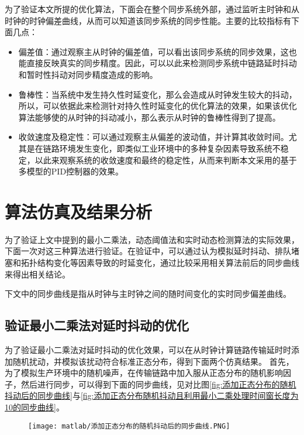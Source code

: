 为了验证本文所提的优化算法，下面会在整个同步系统外部，通过监听主时钟和从时钟的时钟偏差曲线，从而可以知道该同步系统的同步性能。主要的比较指标有下面几点：
\begin{itemize}[noitemsep,topsep=0pt,parsep=0pt,partopsep=0pt]
  \item 偏差值：通过观察主从时钟的偏差值，可以看出该同步系统的同步效果，这也能直接反映真实的同步精度。因此，可以以此来检测同步系统中链路延时抖动和暂时性抖动对同步精度造成的影响。
  \item 鲁棒性：当系统中发生持久性时延变化，那么会造成从时钟发生较大的抖动，所以，可以依据此来检测针对持久性时延变化的优化算法的效果，如果该优化算法能够使的从时钟的抖动减小，那么表示从时钟的鲁棒性得到了提高。
  \item 收敛速度及稳定性：可以通过观察主从偏差的波动值，并计算其收敛时间。尤其是在链路环境发生变化，即类似工业环境中的多种复杂因素导致系统不稳定，以此来观察系统的收敛速度和最终的稳定性，从而来判断本文采用的基于多模型的PID控制器的效果。
\end{itemize}

\section{算法仿真及结果分析}
为了验证上文中提到的最小二乘法，动态阈值法和实时动态检测算法的实际效果，下面一次对这三种算法进行验证。在验证中，可以通过认为模拟延时抖动、排队堵塞和拓扑结构变化等因素导致的时延变化，通过比较采用相关算法前后的同步曲线来得出相关结论。

下文中的同步曲线是指从时钟与主时钟之间的随时间变化的实时同步偏差曲线。

\subsection{验证最小二乘法对延时抖动的优化}
为了验证最小二乘法对延时抖动的优化效果，可以在从时钟计算链路传输延时时添加随机扰动，并模拟该扰动符合标准正态分布，得到下面两个仿真结果。
首先，为了模拟生产环境中的随机噪声，在传输链路中加入服从正态分布的随机影响因子，然后进行同步，可以得到下面的同步曲线，见对比图\ref{fig:添加正态分布的随机抖动后的同步曲线}与\ref{fig:添加正态分布随机抖动且利用最小二乘处理时间窗长度为10的同步曲线}。
\begin{figure}[!hbp]
  \centering
  \begin{minipage}[b]{1\textwidth}
    \captionstyle{\centering}
    \centering
    \texttt{[image: matlab/添加正态分布的随机抖动后的同步曲线.PNG]}
  \end{minipage}     
\end{figure}

